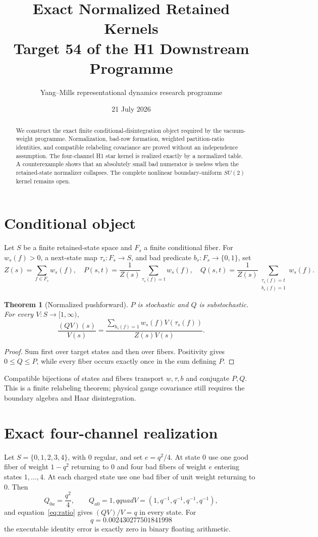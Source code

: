 \documentclass[11pt]{article}
\title{Exact Normalized Retained Kernels\\Target 54 of the H1 Downstream Programme}
\author{Yang--Mills representational dynamics research programme}
\date{21 July 2026}
\newtheorem{theorem}{Theorem}
\begin{document}
\maketitle
\begin{abstract}
We construct the exact finite conditional-disintegration object required by the
vacuum-weight programme.  Normalization, bad-row formation, weighted
partition-ratio identities, and compatible relabeling covariance are proved
without an independence assumption.  The four-channel H1 star kernel is
realized exactly by a normalized table.  A counterexample shows that an
absolutely small bad numerator is useless when the retained-state normalizer
collapses.  The complete nonlinear boundary-uniform $SU(2)$ kernel remains
open.
\end{abstract}

\section{Conditional object}
Let $S$ be a finite retained-state space and $F_s$ a finite conditional fiber.
For $w_s(f)>0$, a next-state map $\tau_s:F_s\to S$, and bad predicate
$b_s:F_s\to\{0,1\}$, set
\[
 Z(s)=\sum_{f\in F_s}w_s(f),\quad
 P(s,t)=\frac1{Z(s)}\sum_{\tau_s(f)=t}w_s(f),\quad
 Q(s,t)=\frac1{Z(s)}\sum_{\substack{\tau_s(f)=t\\b_s(f)=1}}w_s(f).
\]

\begin{theorem}[Normalized pushforward]
$P$ is stochastic and $Q$ is substochastic.  For every $V:S\to[1,\infty)$,
\begin{equation}\label{eq:ratio}
 \frac{(QV)(s)}{V(s)}=
 \frac{\sum_{b_s(f)=1}w_s(f)V(\tau_s(f))}{Z(s)V(s)}.
\end{equation}
\end{theorem}
\begin{proof}
Sum first over target states and then over fibers.  Positivity gives
$0\leq Q\leq P$, while every fiber occurs exactly once in the sum defining
$P$.
\end{proof}

Compatible bijections of states and fibers transport $w,\tau,b$ and conjugate
$P,Q$.  This is a finite relabeling theorem; physical gauge covariance still
requires the boundary algebra and Haar disintegration.

\section{Exact four-channel realization}
Let $S=\{0,1,2,3,4\}$, with $0$ regular, and set $e=q^2/4$.  At state $0$ use
one good fiber of weight $1-q^2$ returning to $0$ and four bad fibers of
weight $e$ entering states $1,\dots,4$.  At each charged state use one bad
fiber of unit weight returning to $0$.  Then
\[
 Q_{0a}=\frac{q^2}{4},\qquad Q_{a0}=1,qquad
 V=(1,q^{-1},q^{-1},q^{-1},q^{-1}),
\]
and equation~\eqref{eq:ratio} gives $(QV)/V=q$ in every state.  For
\[
 q=0.002430277501841998
\]
the executable identity error is exactly zero in binary floating arithmetic.
\end{document}
